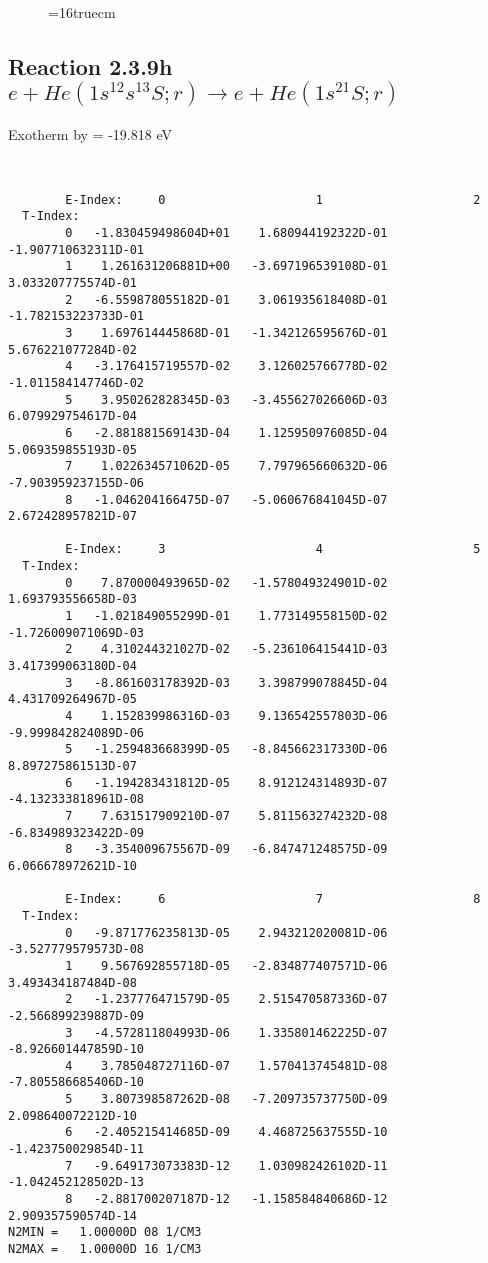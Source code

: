 \documentclass[12pt,dvipdfmx]{article}
\begin{document}
{\begin{small}
\begin{verbatim}
\end{verbatim}\end{small}
\begin{figure} \label{2.3.9g}
\epsfxsize=16truecm
\end{figure}
\newpage

\subsection{
Reaction 2.3.9h  $e + He(1s^12s^13S;r) \rightarrow e + He(1s^21S;r) $
}
Exotherm by =  -19.818 eV

\begin{small}\begin{verbatim}


        E-Index:     0                     1                     2
  T-Index:
        0   -1.830459498604D+01    1.680944192322D-01   -1.907710632311D-01
        1    1.261631206881D+00   -3.697196539108D-01    3.033207775574D-01
        2   -6.559878055182D-01    3.061935618408D-01   -1.782153223733D-01
        3    1.697614445868D-01   -1.342126595676D-01    5.676221077284D-02
        4   -3.176415719557D-02    3.126025766778D-02   -1.011584147746D-02
        5    3.950262828345D-03   -3.455627026606D-03    6.079929754617D-04
        6   -2.881881569143D-04    1.125950976085D-04    5.069359855193D-05
        7    1.022634571062D-05    7.797965660632D-06   -7.903959237155D-06
        8   -1.046204166475D-07   -5.060676841045D-07    2.672428957821D-07

        E-Index:     3                     4                     5
  T-Index:
        0    7.870000493965D-02   -1.578049324901D-02    1.693793556658D-03
        1   -1.021849055299D-01    1.773149558150D-02   -1.726009071069D-03
        2    4.310244321027D-02   -5.236106415441D-03    3.417399063180D-04
        3   -8.861603178392D-03    3.398799078845D-04    4.431709264967D-05
        4    1.152839986316D-03    9.136542557803D-06   -9.999842824089D-06
        5   -1.259483668399D-05   -8.845662317330D-06    8.897275861513D-07
        6   -1.194283431812D-05    8.912124314893D-07   -4.132333818961D-08
        7    7.631517909210D-07    5.811563274232D-08   -6.834989323422D-09
        8   -3.354009675567D-09   -6.847471248575D-09    6.066678972621D-10

        E-Index:     6                     7                     8
  T-Index:
        0   -9.871776235813D-05    2.943212020081D-06   -3.527779579573D-08
        1    9.567692855718D-05   -2.834877407571D-06    3.493434187484D-08
        2   -1.237776471579D-05    2.515470587336D-07   -2.566899239887D-09
        3   -4.572811804993D-06    1.335801462225D-07   -8.926601447859D-10
        4    3.785048727116D-07    1.570413745481D-08   -7.805586685406D-10
        5    3.807398587262D-08   -7.209735737750D-09    2.098640072212D-10
        6   -2.405215414685D-09    4.468725637555D-10   -1.423750029854D-11
        7   -9.649173073383D-12    1.030982426102D-11   -1.042452128502D-13
        8   -2.881700207187D-12   -1.158584840686D-12    2.909357590574D-14
N2MIN =   1.00000D 08 1/CM3
N2MAX =   1.00000D 16 1/CM3


\end{verbatim}
\end{small}}
\end{document}
